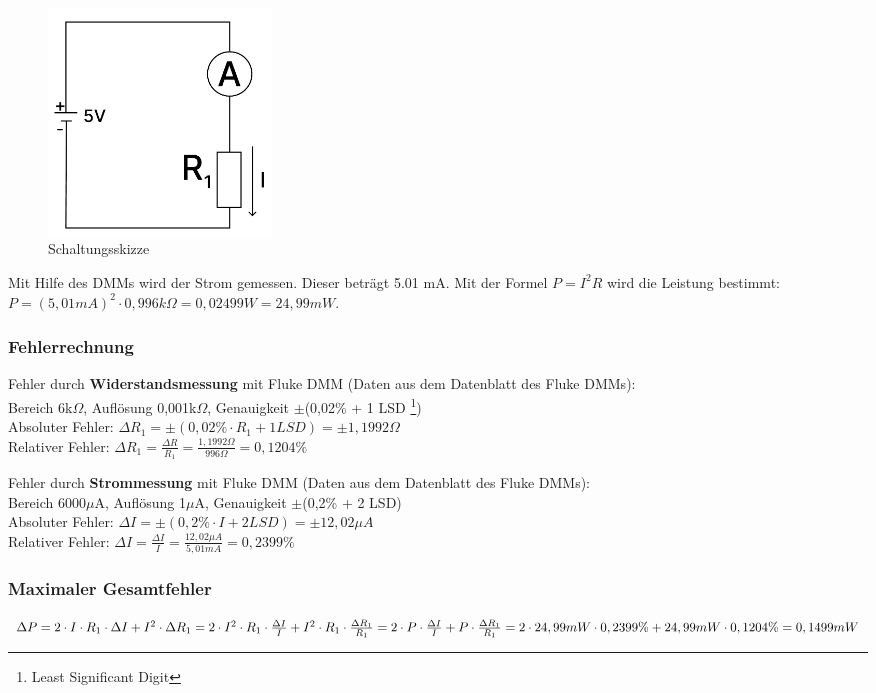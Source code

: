 \begin{figure}[H]
	\centering
	\includegraphics[height=6cm]{images/Versuch3/Versuch3_1_Schaltskizze.pdf} 
	\caption{Schaltungsskizze}
	\label{fig: Schaltungsskizze Versuch 3}
\end{figure}

Mit Hilfe des DMMs wird der Strom gemessen. Dieser beträgt 5.01 mA. Mit der
Formel $P = I^{2}R$ wird die Leistung bestimmt:
$P=(5,01 mA)^{2}\cdot 0,996 k\Omega = 0,02499 W = 24,99mW$.

\subsubsection{Fehlerrechnung}
Fehler durch \textbf{Widerstandsmessung} mit Fluke DMM (Daten aus dem Datenblatt des Fluke DMMs):\\
Bereich 6k$\Omega$, Auflösung 0,001k$\Omega$, Genauigkeit $\pm$(0,02\% + 1 LSD \footnote{Least Significant Digit})\\
Absoluter Fehler: $\Delta R_1 = \pm (0,02\% \cdot R_1 + 1 LSD) = \pm 1,1992 \Omega$\\
Relativer Fehler: $\Delta R_1 = \frac{\Delta R}{R_1} = \frac{1,1992 \Omega}{996 \Omega} = 0,1204\%$\par


Fehler durch \textbf{Strommessung} mit Fluke DMM (Daten aus dem Datenblatt des Fluke DMMs):\\
Bereich 6000$\mu$A, Auflösung 1$\mu$A, Genauigkeit $\pm$(0,2\% + 2 LSD)\\
Absoluter Fehler: $\Delta I = \pm (0,2\% \cdot I + 2 LSD) = \pm 12,02 \mu A$\\
Relativer Fehler: $\Delta I = \frac{\Delta I}{I} = \frac{12,02 \mu A}{5,01 mA} = 0,2399\%$\\

\subsubsection{Maximaler Gesamtfehler}
$\Delta P = 2 \cdot I \cdot R_1 \cdot \Delta I + I^2 \cdot \Delta R_1 = 
2 \cdot I^2 \cdot R_1 \cdot \frac{\Delta I}{I} + I^2 \cdot R_1 \cdot \frac{\Delta R_1}{R_1} =
2 \cdot P \cdot \frac{\Delta I}{I} + P \cdot \frac{\Delta R_1}{R_1} = \\
2 \cdot 24,99 mW \cdot 0,2399\% + 24,99 mW \cdot 0,1204\% = 0,1499 mW $

